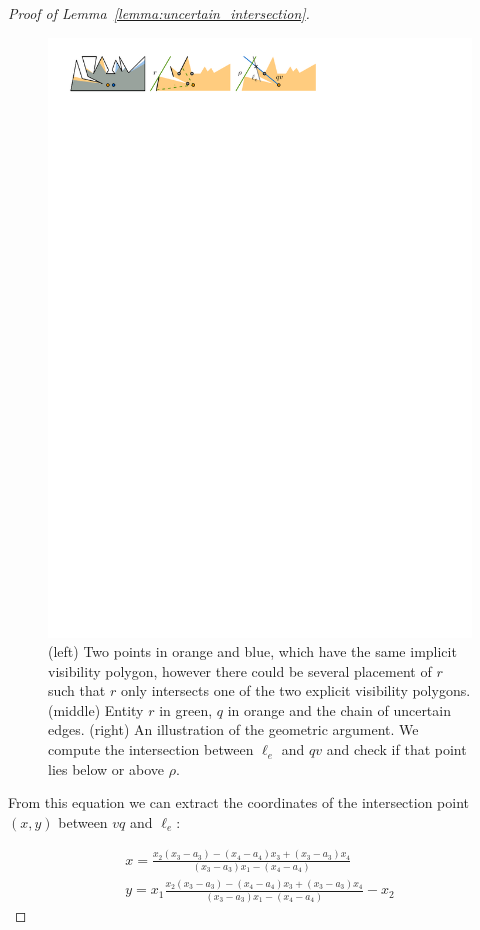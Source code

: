 \documentclass[a4paper, UKenglish]{paper}
\begin{document}
\begin{proof}[Proof of Lemma~\ref{lemma:uncertain_intersection}]
\begin{figure}[h]
    \centering
    \includegraphics[]{../pointline}
    \caption{ (left) Two points in orange and blue, which have the same implicit visibility polygon, however there could be several placement of $r$ such that $r$ only intersects one of the two explicit visibility polygons. (middle) Entity $r$ in green, $q$ in orange and the chain of uncertain edges. (right) An illustration of the geometric argument. We compute the intersection between $\ell_e$ and $qv$ and check if that point lies below or above $\rho$.}
    \label{fig:pointline}
\end{figure}


From this equation we can extract the coordinates of the intersection point $(x,y)$ between $vq$ and $\ell_e$:

\begin{align*}
    x = \frac{x_2 (x_3 - a_3) - (x_4 - a_4)x_3 + (x_3 - a_3) x_4}{ (x_3 - a_3)x_1 - (x_4 - a_4)} \\
    y = x_1 \frac{x_2 (x_3 - a_3) - (x_4 - a_4)x_3 + (x_3 - a_3) x_4}{ (x_3 - a_3)x_1 - (x_4 - a_4)} - x_2
\end{align*}


\end{proof}
\end{document}
